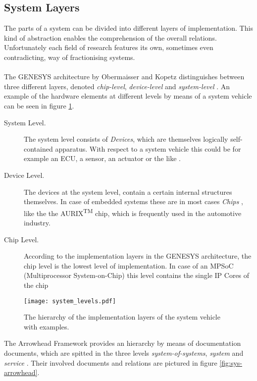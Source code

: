 \subsection{System Layers}
\label{ch:system_layers}
The parts of a system can be divided into different layers of implementation. This kind of abstraction enables the comprehension of the overall relations. Unfortunately each field of research features its own, sometimes even contradicting, way of fractionising systems.
\\
\\
The GENESYS architecture by Obermaisser and Kopetz distinguishes between three different layers, denoted \emph{chip-level}, \emph{device-level} and \emph{system-level} \cite[p.44]{genesys}. An example of the hardware elements at different levels by means of a system vehicle can be seen in figure \ref{fig:integration_levels}.
\begin{description}
\item [System Level.]
The system level consists of \emph{Devices}, which are themselves logically self-contained apparatus. With respect to a system vehicle this could be for example an ECU, a sensor, an actuator or the like \cite[p.45]{genesys}.
\item [Device Level.]
The devices at the system level, contain a certain internal structures themselves. In case of embedded systems these are in most cases \emph{Chips} \cite[p.45]{genesys}, like the the AURIX\textsuperscript{TM} chip, which is frequently used in the automotive industry.
\item [Chip Level.]
According to the implementation layers in the GENESYS architecture, the chip level is the lowest level of implementation. In case of an MPSoC (Multiprocessor System-on-Chip) this level contains the single IP Cores of the chip \cite[p.46]{genesys}
\end{description}

\begin{figure}[!htbp]
\centering
\texttt{[image: system\_levels.pdf]}
\caption{The hierarchy of the implementation layers of the system vehicle with examples.}
\label{fig:integration_levels}
\end{figure}

The Arrowhead Framework provides an hierarchy by means of documentation documents, which are spitted in the three levels \emph{system-of-systems}, \emph{system} and \emph{service} \cite{arrowhead_inpr}. Their involved documents and relations are pictured in figure \ref{fig:sys-arrowhead}.

